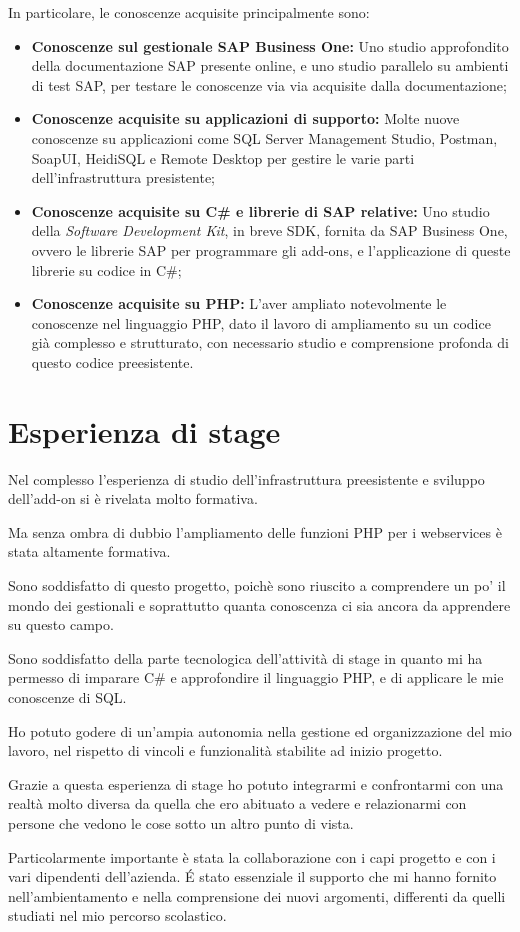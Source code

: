 In particolare, le conoscenze acquisite principalmente sono:
\begin{itemize}
    \item \textbf{Conoscenze sul gestionale SAP Business One: }Uno studio approfondito della documentazione SAP presente online, e uno studio parallelo su ambienti di test SAP, per testare le conoscenze via via acquisite dalla documentazione;
    \item \textbf{Conoscenze acquisite su applicazioni di supporto: } Molte nuove conoscenze su applicazioni come SQL Server Management Studio, Postman, SoapUI, HeidiSQL e Remote Desktop per gestire le varie parti dell'infrastruttura presistente;
    \item \textbf{Conoscenze acquisite su C\# e librerie di SAP relative: } Uno studio della \textit{Software Development Kit}, in breve SDK, fornita da SAP Business One, ovvero le librerie SAP per programmare gli add-ons, e l'applicazione di queste librerie su codice in C\#;
    \item \textbf{Conoscenze acquisite su PHP: } L'aver ampliato notevolmente le conoscenze nel linguaggio PHP, dato il lavoro di ampliamento su un codice già complesso e strutturato, con necessario studio e comprensione profonda di questo codice preesistente.
\end{itemize}

\section{Esperienza di stage}

Nel complesso l'esperienza di studio dell'infrastruttura preesistente e sviluppo dell'add-on si è rivelata molto formativa.

Ma senza ombra di dubbio l'ampliamento delle funzioni PHP per i webservices è stata altamente formativa.

\newspace

Sono soddisfatto di questo progetto, poichè sono riuscito a comprendere un po' il mondo dei gestionali e soprattutto quanta conoscenza ci sia ancora da apprendere su questo campo.

Sono soddisfatto della parte tecnologica dell'attività di stage in quanto mi ha permesso di imparare C\# e approfondire il linguaggio PHP, e di applicare le mie conoscenze di SQL.

\newspace

Ho potuto godere di un'ampia autonomia nella gestione ed organizzazione del mio lavoro, nel rispetto di vincoli e funzionalità stabilite ad inizio progetto.

Grazie a questa esperienza di stage ho potuto integrarmi e confrontarmi con una realtà molto diversa da quella che ero abituato a vedere e relazionarmi con persone che vedono le cose sotto un altro punto di vista.

Particolarmente importante è stata la collaborazione con i capi progetto e con i vari dipendenti dell'azienda. \'E stato essenziale il supporto che mi hanno fornito nell'ambientamento e nella comprensione dei nuovi argomenti, differenti da quelli studiati nel mio percorso scolastico.
